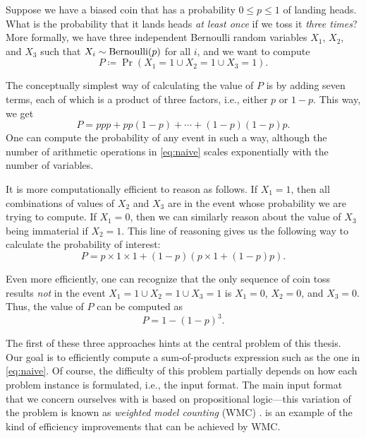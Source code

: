 \begin{example} \label{example:veryfirst}
  Suppose we have a biased coin that has a probability $0 \le p \le 1$ of landing heads. What is the probability that it lands heads \emph{at least once} if we toss it \emph{three times}? More formally, we have three independent Bernoulli random variables $X_1$, $X_2$, and $X_3$ such that $X_i \sim \operatorname{Bernoulli}(p)$ for all $i$, and we want to compute
  \[
  P \coloneqq \Pr(X_1 = 1 \cup X_2 = 1 \cup X_3 = 1).
  \]

  The conceptually simplest way of calculating the value of $P$ is by adding seven terms, each of which is a product of three factors, i.e., either $p$ or $1-p$. This way, we get
  \begin{equation} \label{eq:naive}
  P = ppp + pp(1-p) + \cdots + (1-p)(1-p)p.
  \end{equation}
  One can compute the probability of any event in such a way, although the number of arithmetic operations in \cref{eq:naive} scales exponentially with the number of variables.

  It is more computationally efficient to reason as follows. If $X_1 = 1$, then all combinations of values of $X_2$ and $X_3$ are in the event whose probability we are trying to compute. If $X_1 = 0$, then we can similarly reason about the value of  $X_3$ being immaterial if $X_2 = 1$. This line of reasoning gives us the following way to calculate the probability of interest:
  \begin{equation} \label{eq:wmcexample}
  P = p \times 1 \times 1 + (1-p)(p \times 1 + (1-p)p).
  \end{equation}

  Even more efficiently, one can recognize that the only sequence of coin toss results \emph{not} in the event $X_1 = 1 \cup X_2 = 1 \cup X_3 = 1$ is $X_1 = 0$, $X_2 = 0$, and $X_3 = 0$. Thus, the value of $P$ can be computed as
  \begin{equation} \label{eq:wfomcexample}
  P = 1 - (1-p)^3.
  \end{equation}
\end{example}

The first of these three approaches hints at the central problem of this thesis. Our goal is to efficiently compute a sum-of-products expression such as the one in \cref{eq:naive}. Of course, the difficulty of this problem partially depends on how each problem instance is formulated, i.e., the input format. The main input format that we concern ourselves with is based on propositional logic---this variation of the problem is known as \emph{weighted model counting} (WMC) \citep{DBLP:journals/ai/ChaviraD08}.  is an example of the kind of efficiency improvements that can be achieved by WMC.

